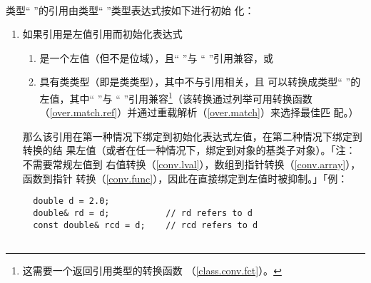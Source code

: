 \paragraph{}
类型`` ''的引用由类型`` ''类型表达式按如下进行初始
化：
\begin{enumerate}
  \item{如果引用是左值引用而初始化表达式
    \begin{enumerate}
      \item{是一个左值（但不是位域），且`` ''与
        `` ''引用兼容，或}
      \item{具有类类型（即是类类型），其中不与引用相关，且
        可以转换成类型`` ''的左值，其中`` ''与
        `` ''引用兼容\footnote{这需要一个返回引用类型的转换函数
        （\ref{class.conv.fct}）。}（该转换通过列举可用转换函数
        （\ref{over.match.ref}）并通过重载解析（\ref{over.match}）来选择最佳匹
         配。）}
    \end{enumerate}
    那么该引用在第一种情况下绑定到初始化表达式左值，在第二种情况下绑定到转换的结
    果左值（或者在任一种情况下，绑定到对象的基类子对象）。「注：不需要常规左值到
    右值转换（\ref{conv.lval}），数组到指针转换（\ref{conv.array}），函数到指针
    转换（\ref{conv.func}），因此在直接绑定到左值时被抑制。」「例：
\begin{lstlisting}
  double d = 2.0;
  double& rd = d;           // rd refers to d
  const double& rcd = d;    // rcd refers to d


\end{lstlisting}}
\end{enumerate}
